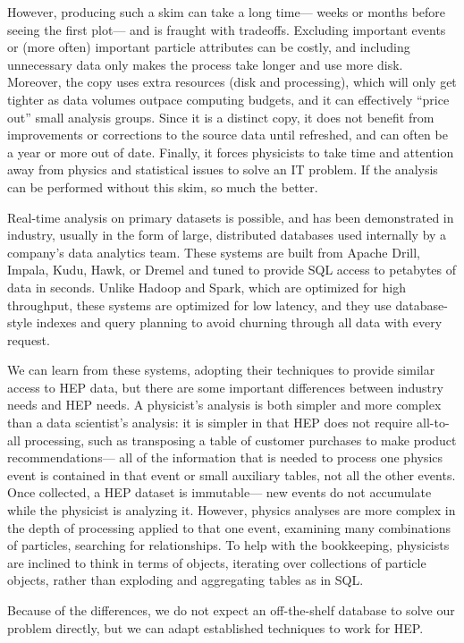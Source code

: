 \documentclass[a4paper]{jpconf}
\begin{document}
However, producing such a skim can take a long time--- weeks or months before seeing the first plot--- and is fraught with tradeoffs. Excluding important events or (more often) important particle attributes can be costly, and including unnecessary data only makes the process take longer and use more disk. Moreover, the copy uses extra resources (disk and processing), which will only get tighter as data volumes outpace computing budgets, and it can effectively ``price out'' small analysis groups. Since it is a distinct copy, it does not benefit from improvements or corrections to the source data until refreshed, and can often be a year or more out of date. Finally, it forces physicists to take time and attention away from physics and statistical issues to solve an IT problem. If the analysis can be performed without this skim, so much the better.

Real-time analysis on primary datasets is possible, and has been demonstrated in industry, usually in the form of large, distributed databases used internally by a company's data analytics team. These systems are built from Apache Drill, Impala, Kudu, Hawk, or Dremel and tuned to provide SQL access to petabytes of data in seconds. Unlike Hadoop and Spark, which are optimized for high throughput, these systems are optimized for low latency, and they use database-style indexes and query planning to avoid churning through all data with every request.

We can learn from these systems, adopting their techniques to provide similar access to HEP data, but there are some important differences between industry needs and HEP needs. A physicist's analysis is both simpler and more complex than a data scientist's analysis: it is simpler in that HEP does not require all-to-all processing, such as transposing a table of customer purchases to make product recommendations--- all of the information that is needed to process one physics event is contained in that event or small auxiliary tables, not all the other events. Once collected, a HEP dataset is immutable--- new events do not accumulate while the physicist is analyzing it. However, physics analyses are more complex in the depth of processing applied to that one event, examining many combinations of particles, searching for relationships. To help with the bookkeeping, physicists are inclined to think in terms of objects, iterating over collections of particle objects, rather than exploding and aggregating tables as in SQL.

Because of the differences, we do not expect an off-the-shelf database to solve our problem directly, but we can adapt established techniques to work for HEP.
\end{document}
